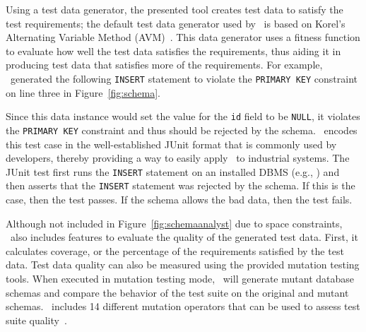 Using a test data generator, the presented tool creates test data to satisfy the test requirements; the default test
data generator used by \sa~is based on Korel's Alternating Variable Method (AVM)~\cite{Korel:AVM}. This data generator
uses a fitness function to evaluate how well the test data satisfies the requirements, thus aiding it in producing
test data that satisfies more of the requirements. For example, \sa~generated the following \texttt{INSERT} statement to
violate the \texttt{PRIMARY KEY} constraint on line three in Figure~\ref{fig:schema}.


\vspace{1ex}

\noindent {}

\vspace{1ex}


Since this data instance would set the value for the \texttt{id} field to be \texttt{NULL}, it violates the
\texttt{PRIMARY KEY} constraint and thus should be rejected by the schema. \sa~encodes this test case in the
well-established JUnit format that is commonly used by developers, thereby providing a way to easily apply \sa~to
industrial systems.  The JUnit test first runs the \texttt{INSERT} statement on an installed DBMS (e.g., \sqlite) and
then asserts that the \texttt{INSERT} statement was rejected by the schema. If this is the case, then the test passes.
If the schema allows the bad data, then the test fails.


Although not included in Figure~\ref{fig:schemaanalyst} due to space constraints, \sa~also includes features to evaluate
the quality of the generated test data. First, it calculates coverage, or the percentage of the requirements satisfied
by the test data.  Test data quality can also be measured using the provided mutation testing tools. When executed in
mutation testing mode, \sa~will generate mutant database schemas and compare the behavior of the test suite on the
original and mutant schemas. \sa~includes 14 different mutation operators that can be used to assess test suite
quality~\cite{wright2015mutation}.



